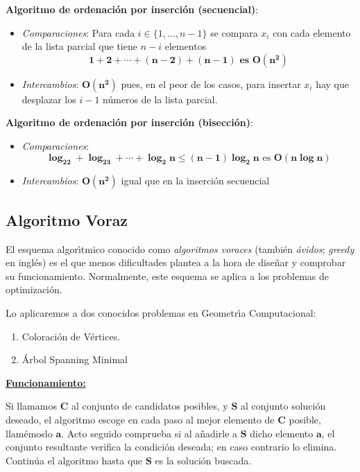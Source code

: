 \documentclass[twoside]{report}
\newcommand{\bs}[1]{\boldsymbol{#1}}
\begin{document}
 \noindent\textbf{Algoritmo de ordenaci\'{o}n por inserci\'{o}n (secuencial)}:
    \begin{itemize}
       \item \emph{Comparaciones}: Para cada $i\in \{1,\ldots, n-1\}$ se compara $x_i$ con cada elemento de la lista parcial que tiene $n-i$ elementos $$\bs{1+2+\cdots +(n-2)+(n-1) \mbox{ es } O(n^2)}$$

       \item \emph{Intercambios}: $\bs{O(n^2)}$ pues, en el peor de los casos, para insertar $x_i$ hay que desplazar los $i-1$ n\'{u}meros de la lista parcial.
    \end{itemize}


 \noindent\textbf{Algoritmo de ordenaci\'{o}n por inserci\'{o}n (bisecci\'{o}n)}:
    \begin{itemize}
        \item \emph{Comparaciones}: $$\bs{\log_22+\log_23+\cdots+\log_2n\leq (n-1)\log_2n} \text{ es } \bs{O(n\log n)}$$
        \item \emph{Intercambios}: $\bs{O(n^2)}$ igual que en la inserci\'{o}n secuencial
    \end{itemize}


\subsection{Algoritmo Voraz}

El esquema algor\'{\i}tmico conocido como \emph{algoritmos voraces} (tambi\'{e}n \emph{\'{a}vidos}; \emph{greedy} en ingl\'{e}s) es el que menos dificultades plantea a la hora de dise\~{n}ar y comprobar su funcionamiento. Normalmente, este esquema se aplica a los problemas de optimizaci\'{o}n.
\vspace{0.2cm}

Lo aplicaremos a dos conocidos problemas en Geometr\'{\i}a Computacional:
        \begin{enumerate}
            \item Coloraci\'{o}n de V\'{e}rtices.
            \item \'{A}rbol Spanning Minimal
        \end{enumerate}

\noindent\underline{\textbf{Funcionamiento:}}
\vspace{0.2cm}

Si llamamos $\bs{C}$ al conjunto de candidatos posibles, y $\bs{S}$ al conjunto soluci\'{o}n deseado, el algoritmo escoge en cada paso al mejor
elemento de $\bs{C}$ posible, llam\'{e}moslo $\bs{a}$. Acto seguido comprueba si al a\~{n}adirle a $\bs{S}$ dicho elemento $\bs{a}$, el conjunto
resultante verifica la condici\'{o}n deseada; en caso contrario lo elimina. Contin\'{u}a el algoritmo hasta que $\bs{S}$ es la soluci\'{o}n buscada.
\end{document}
